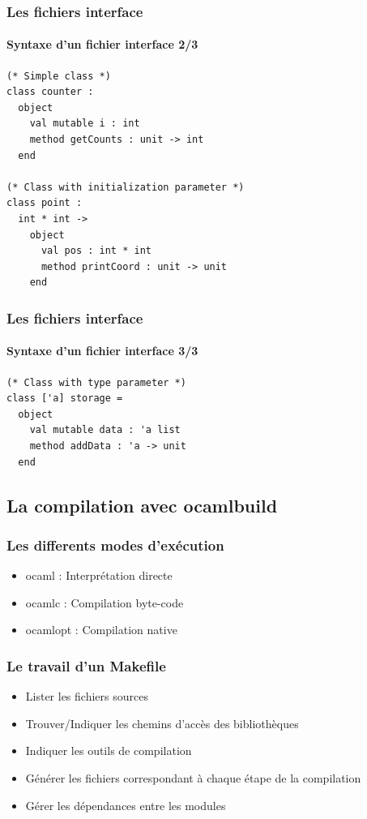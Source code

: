\begin{frame}[fragile]
	\frametitle{Les fichiers interface}
	\framesubtitle{Syntaxe d'un fichier interface 2/3}
	\lstset{basicstyle=\small}
	\begin{lstlisting}
(* Simple class *)
class counter :
  object
    val mutable i : int
    method getCounts : unit -> int
  end

(* Class with initialization parameter *)
class point :
  int * int ->
    object
      val pos : int * int
      method printCoord : unit -> unit
    end
	\end{lstlisting}
\end{frame}

\begin{frame}[fragile]
	\frametitle{Les fichiers interface}
	\framesubtitle{Syntaxe d'un fichier interface 3/3}
	\lstset{basicstyle=\small}
	\begin{lstlisting}
(* Class with type parameter *)
class ['a] storage =
  object
    val mutable data : 'a list
    method addData : 'a -> unit
  end
	\end{lstlisting}
\end{frame}

\subsection{La compilation avec ocamlbuild} %
\begin{frame}[fragile]
	\frametitle{Les differents modes d'exécution}
	\huge
	\begin{itemize}
		\item ocaml : Interprétation directe
		\item ocamlc : Compilation byte-code
		\item ocamlopt : Compilation native
	\end{itemize}
	\normalsize
\end{frame}

\begin{frame}
	\frametitle{Le travail d'un Makefile}
	\begin{center}
		\begin{itemize}
			\item Lister les fichiers sources
			\item Trouver/Indiquer les chemins d'accès des bibliothèques
			\item Indiquer les outils de compilation
			\item Générer les fichiers correspondant à chaque étape de la compilation
			\item Gérer les dépendances entre les modules
		\end{itemize}
	\end{center}
\end{frame}


